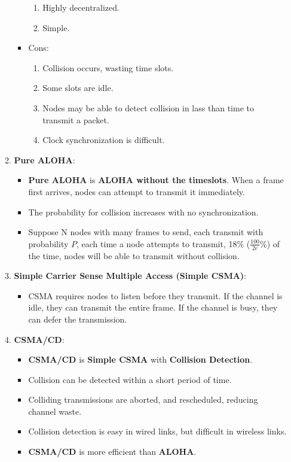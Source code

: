 \documentclass{article}
\begin{document}
\begin{itemize}
\begin{enumerate}
\begin{itemize}
\begin{enumerate}
                    \item Highly decentralized.
                    \item Simple.
                \end{enumerate}
                \item Cons:
                \begin{enumerate}
                    \item Collision occurs, wasting time slots.
                    \item Some slots are idle.
                    \item Nodes may be able to detect collision in lass than time to transmit a packet.
                    \item Clock synchronization is difficult.
                \end{enumerate}
            \end{itemize}
            \item \textbf{Pure ALOHA}:
            \begin{itemize}
                \item \textbf{Pure ALOHA} is \textbf{ALOHA without the timeslots}. When a frame first arrives, nodes can attempt to transmit it immediately.
                \item The probability for collision increases with no synchronization.
                \item Suppose N nodes with many frames to send, each transmit with probability $P$, each time a node attempts to transmit, 18\% ($\frac{100}{2e}$\%) of the time, nodes will be able to transmit without collision.
            \end{itemize}
            \item \textbf{Simple Carrier Sense Multiple Access (Simple CSMA)}:
            \begin{itemize}
                \item CSMA requires nodes to listen before they transmit. If the channel is idle, they can transmit the entire frame. If the channel is busy, they can defer the transmission.
            \end{itemize}
            \item \textbf{CSMA/CD}:
            \begin{itemize}
                \item \textbf{CSMA/CD} is \textbf{Simple CSMA} with \textbf{Collision Detection}.
                \item Collision can be detected within a short period of time.
                \item Colliding transmissions are aborted, and rescheduled, reducing channel waste.
                \item Collision detection is easy in wired links, but difficult in wireless links.
                \item \textbf{CSMA/CD} is more efficient than \textbf{ALOHA}.
            \end{itemize}
        \end{enumerate}
    \end{itemize}
\end{document}
